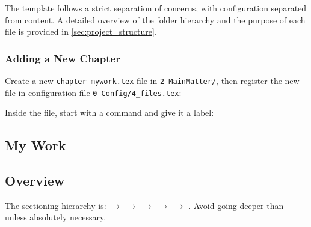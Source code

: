 The \novathesis{} template follows a strict separation of concerns, with configuration separated from content. A detailed overview of the folder hierarchy and the purpose of each file is provided in \autoref{sec:project_structure}.


\subsection{Adding a New Chapter}
\label{sub:adding_chapter}

Create a new \texttt{chapter-mywork.tex} file in \texttt{2-MainMatter/}, then register the new file in configuration file \texttt{0-Config/4\_files.tex}:

\begin{latexcode}
\end{latexcode}

Inside the file, start with a \latexinline{\chapter} command and give it a label:

\begin{latexcode}
\chapter{My Work}
\label{cha:my_work}

\section{Overview}
\label{sec:overview}
\end{latexcode}

The sectioning hierarchy is:
\latexinline{\chapter} \(\to\) \latexinline{\section} \(\to\) \latexinline{\subsection} \(\to\) \latexinline{\subsubsection} \(\to\) \latexinline{\paragraph} \(\to\) \latexinline{\subparagraph}.
Avoid going deeper than \latexinline{\subsection} unless absolutely necessary.



